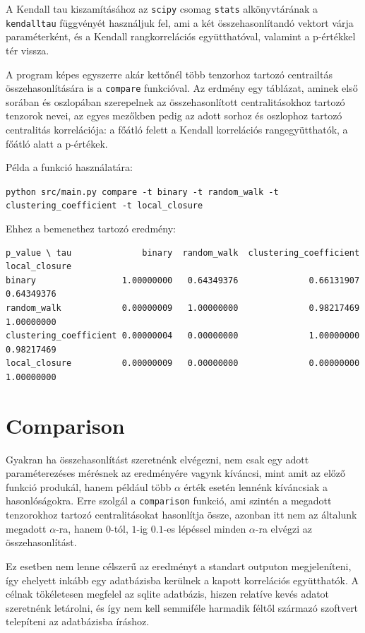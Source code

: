 \documentclass[12pt,numbers=noenddot]{report}
\begin{document}
A Kendall tau kiszamításához az \texttt{scipy} csomag \texttt{stats} 
alkönyvtárának a \texttt{kendalltau} függvényét használjuk fel, ami a két 
összehasonlítandó vektort várja paraméterként, és a Kendall rangkorrelációs 
együtthatóval, valamint a p-értékkel tér vissza.

A program képes egyszerre akár kettőnél több tenzorhoz tartozó centrailtás 
összehasonlítására is a \texttt{compare} funkcióval. Az erdmény egy táblázat, aminek első sorában és 
oszlopában szerepelnek az összehasonlított centralitásokhoz tartozó tenzorok 
nevei, az egyes mezőkben pedig az adott sorhoz és oszlophoz tartozó centralitás
korrelációja: a főátló felett a Kendall korrelációs rangegyütthatók, a főátló
alatt a p-értékek.

\noindent
Példa a funkció használatára:

\texttt{python src/main.py compare -t binary -t random\_walk -t clustering\_coefficient -t local\_closure}

\pagebreak

\noindent
Ehhez a bemenethez tartozó eredmény:

\scriptsize
\begin{verbatim}
p_value \ tau              binary  random_walk  clustering_coefficient  local_closure
binary                 1.00000000   0.64349376              0.66131907     0.64349376
random_walk            0.00000009   1.00000000              0.98217469     1.00000000
clustering_coefficient 0.00000004   0.00000000              1.00000000     0.98217469
local_closure          0.00000009   0.00000000              0.00000000     1.00000000
\end{verbatim}
\normalsize

\section{Comparison}

Gyakran ha összehasonlítást szeretnénk elvégezni, nem csak egy adott 
paraméterezéses mérésnek az eredményére vagynk kíváncsi, mint amit az előző
funkció produkál, hanem például több $\alpha$ érték esetén lennénk kíváncsiak
a hasonlóságokra. Erre szolgál a \texttt{comparison} funkció, ami szintén 
a megadott tenzorokhoz tartozó centralitásokat hasonlítja össze, azonban itt 
nem az általunk megadott $\alpha$-ra, hanem $0$-tól, $1$-ig $0.1$-es lépéssel
minden $\alpha$-ra elvégzi az összehasonlítást.

Ez esetben nem lenne célszerű az eredményt a standart outputon megjeleníteni,
így ehelyett inkább egy adatbázisba kerülnek a kapott korrelációs együtthatók.
A célnak tökéletesen megfelel az sqlite adatbázis, hiszen relatíve kevés 
adatot szeretnénk letárolni, és így nem kell semmiféle harmadik féltől 
származó szoftvert telepíteni az adatbázisba íráshoz.
\end{document}
